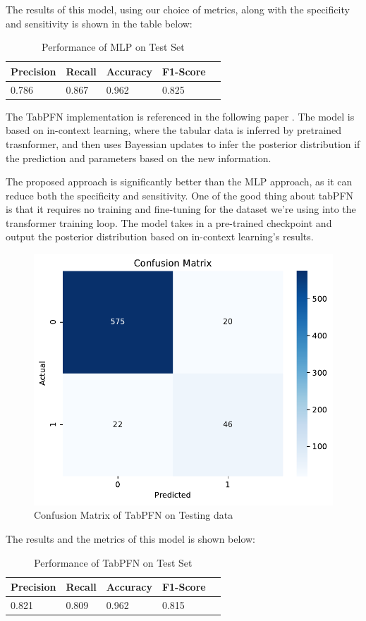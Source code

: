 \documentclass[10pt,letterpaper]{article}
\begin{document}
The results of this model, using our choice of metrics, along with the specificity and sensitivity is shown in the table below:

\begin{table}[H]
\centering
\footnotesize
\begin{tabular}{lllll}
\toprule
\textbf{Precision} & \textbf{Recall} & \textbf{Accuracy} &  \textbf{F1-Score}\\
\midrule
0.786 & 0.867 & 0.962 & 0.825  \\
\bottomrule
\end{tabular}
\caption{Performance of MLP on Test Set}%
\end{table}

The TabPFN implementation is referenced in the following paper \cite{hollmann2022tabpfn}. The model is based on in-context learning, where the tabular data is inferred by pretrained trasnformer, and then uses Bayessian updates to infer the posterior distribution if the prediction and parameters based on the new information. 

The proposed approach is significantly better than the MLP approach, as it can reduce both the specificity and sensitivity. One of the good thing about tabPFN is that it requires no training and fine-tuning for the dataset we're using into the transformer training loop. The model takes in a pre-trained checkpoint and output the posterior distribution based on in-context learning's results. 

\begin{figure}[H]
    \centering
    \includegraphics[width=0.5\linewidth]{plots/tabpfn_confusion_matrix.pdf}
    \caption{Confusion Matrix of TabPFN on Testing data}
    \label{fig:confusion-matrix-transformer}
\end{figure}

The results and the metrics of this model is shown below:

\begin{table}[H]
\centering
\footnotesize
\begin{tabular}{lllll}
\toprule
\textbf{Precision} & \textbf{Recall} & \textbf{Accuracy} &  \textbf{F1-Score}\\
\midrule
0.821 & 0.809 & 0.962 & 0.815  \\
\bottomrule
\end{tabular}
\caption{Performance of TabPFN on Test Set}%
\end{table}
\end{document}
